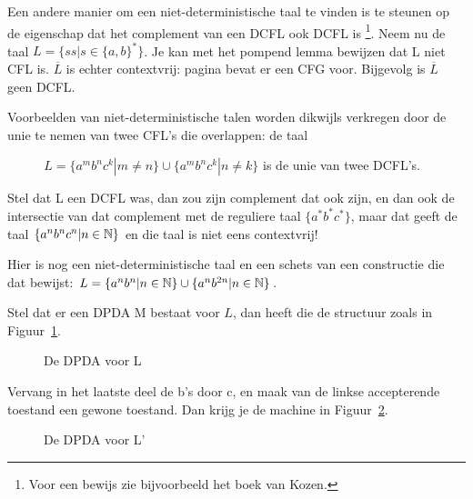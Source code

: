 Een andere manier om een niet-deterministische taal te vinden is te
steunen op de eigenschap dat het complement van een DCFL ook DCFL is
\footnote{Voor een bewijs zie bijvoorbeeld het boek van Kozen.}. Neem
nu de taal $L = \{ss| s \in \{a,b\}^*\}$. Je kan met het pompend lemma
bewijzen dat L niet CFL is. $\overline{L}$ is echter contextvrij:
pagina \pageref{zelfdoen1} bevat er een CFG voor. Bijgevolg is
$\overline{L}$ geen DCFL.  

Voorbeelden van niet-deterministische talen worden dikwijls verkregen
door de unie te nemen van twee CFL's die overlappen: de taal


$~~~~~~~~~~~~~L = \{a^mb^nc^k| m \neq n\} \cup \{a^mb^nc^k|n \neq k\}$ is de unie van
twee DCFL's.


Stel dat L een DCFL was, dan zou zijn complement dat ook
zijn, en dan ook de intersectie van dat complement met de reguliere
taal $\{a^*b^*c^*\}$, maar dat geeft de taal $\{a^nb^nc^n|n \in \mathbb{N}\}$
en die taal is niet eens contextvrij!  

Hier is nog een niet-deterministische taal en een schets van een
constructie die dat bewijst:
$L = \{a^nb^n|n \in \mathbb{N}\} \cup \{a^nb^{2n}|n \in \mathbb{N}\}$.

\newpage
Stel dat er een DPDA M bestaat voor $L$, dan heeft die de structuur
zoals in Figuur~\ref{dpda1}.

\medskip
\begin{figure}[h]
\caption{De DPDA voor L\label{dpda1}}
\end{figure}

Vervang in het laatste deel de b's door c, en maak van de linkse
accepterende toestand een gewone toestand. Dan krijg je de machine in
Figuur~\ref{dpda2}.


\begin{figure}[h]
\caption{De DPDA voor L'\label{dpda2}}
\end{figure}

